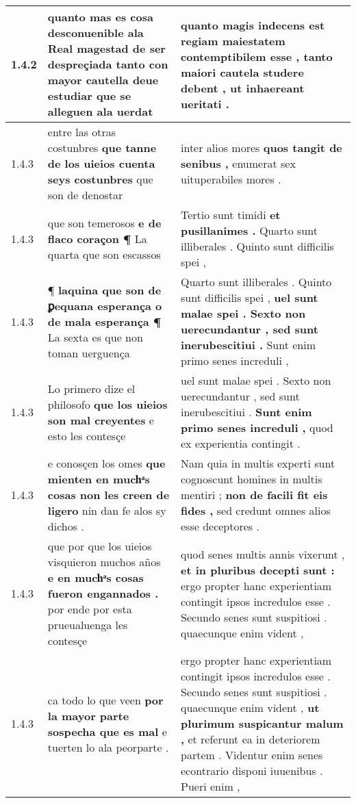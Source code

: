 \begin{tabular}{|p{1cm}|p{6.5cm}|p{6.5cm}|}
1.4.2 & quanto mas es cosa desconuenible ala Real magestad de ser despreçiada \textbf{ tanto con mayor cautella deue estudiar } que se alleguen ala uerdat & quanto magis indecens est regiam maiestatem contemptibilem esse , \textbf{ tanto maiori cautela studere debent , } ut inhaereant ueritati . \\\hline
1.4.3 & entre las otras costunbres \textbf{ que tanne de los uieios cuenta seys costunbres } que son de denostar & inter alios mores \textbf{ quos tangit de senibus , } enumerat sex uituperabiles mores . \\\hline
1.4.3 & que son temerosos \textbf{ e de flaco coraçon ¶ } La quarta que son escassos & Tertio sunt timidi \textbf{ et pusillanimes . } Quarto sunt illiberales . Quinto sunt difficilis spei , \\\hline
1.4.3 & ¶ \textbf{ laquina que son de ꝑequana esperança o de mala esperança ¶ } La sexta es que non toman uerguença & Quarto sunt illiberales . Quinto sunt difficilis spei , \textbf{ uel sunt malae spei . Sexto non uerecundantur , sed sunt inerubescitiui . } Sunt enim primo senes increduli , \\\hline
1.4.3 & Lo primero dize el philosofo \textbf{ que los uieios son mal creyentes } e esto les contesçe & uel sunt malae spei . Sexto non uerecundantur , sed sunt inerubescitiui . \textbf{ Sunt enim primo senes increduli , } quod ex experientia contingit . \\\hline
1.4.3 & e conosçen los omes \textbf{ que mienten en muchͣs cosas non les creen de ligero } nin dan fe alos sy dichos . & Nam quia in multis experti sunt cognoscunt homines in multis mentiri ; \textbf{ non de facili fit eis fides , } sed credunt omnes alios esse deceptores . \\\hline
1.4.3 & que por que los uieios visquieron muchos años \textbf{ e en muchͣs cosas fueron engannados . } por ende por esta prueualuenga les contesçe & quod senes multis annis vixerunt , \textbf{ et in pluribus decepti sunt : } ergo propter hanc experientiam contingit ipsos incredulos esse . Secundo senes sunt suspitiosi . quaecunque enim vident , \\\hline
1.4.3 & ca todo lo que veen \textbf{ por la mayor parte sospecha que es mal } e tuerten lo ala peorparte . & ergo propter hanc experientiam contingit ipsos incredulos esse . Secundo senes sunt suspitiosi . quaecunque enim vident , \textbf{ ut plurimum suspicantur malum , } et referunt ea in deteriorem partem . Videntur enim senes econtrario disponi iuuenibus . Pueri enim , \\\hline

\end{tabular}
